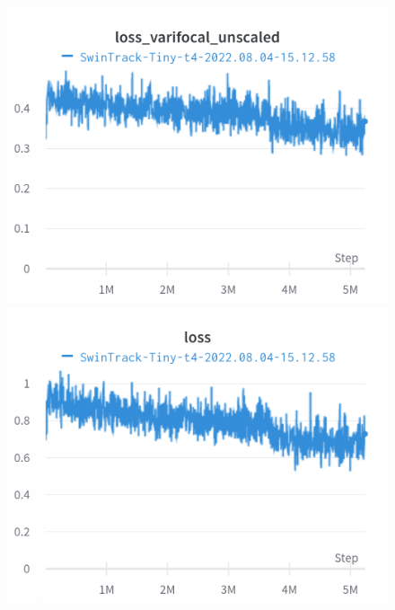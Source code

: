 \documentclass{article}
\begin{document}
\begin{figure}[h]
\includegraphics[width=\linewidth]{charts/Section-2-Panel-10-575xxa84m}
\caption{}
\endminipage\hfill
{}
\includegraphics[width=\linewidth]{charts/Section-2-Panel-11-jg4qpu2ty}
\caption{}
\endminipage
\end{figure}
\end{document}
